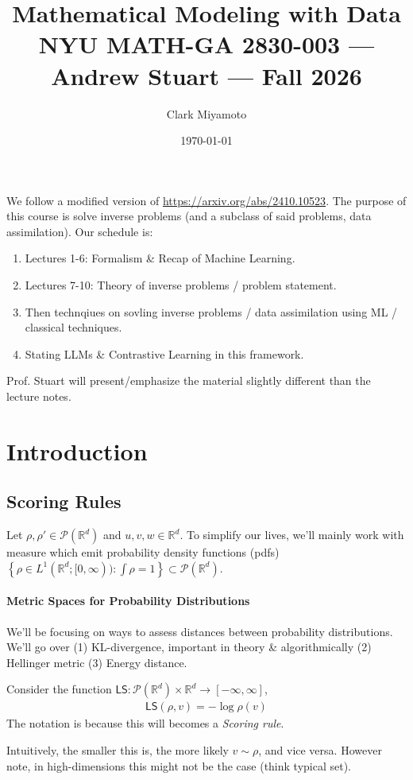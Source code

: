 \documentclass[11pt,fleqn]{article}
\title{Mathematical Modeling with Data \\[0.3em]
       \large NYU MATH-GA 2830-003 --- Andrew Stuart --- Fall 2026}
\author{Clark Miyamoto}
\date{\today}
\numberwithin{equation}{section}
\theoremstyle{definition}
\theoremstyle{definition}
\begin{document}
\maketitle

We follow a modified version of \url{https://arxiv.org/abs/2410.10523}. The purpose of this course is solve inverse problems (and a subclass of said problems, data assimilation). Our schedule is:
\begin{enumerate}
	\item Lectures 1-6: Formalism \& Recap of Machine Learning.
	\item Lectures 7-10: Theory of inverse problems / problem statement.
	\item Then technqiues on sovling inverse problems / data assimilation using ML / classical techniques.
	\item Stating LLMs \& Contrastive Learning in this framework.
\end{enumerate}
Prof. Stuart will present/emphasize the material slightly different than the lecture notes.

\tableofcontents

\newpage

\section{Introduction}

\subsection{Scoring Rules}
Let $\rho,\rho' \in \mathcal P(\mathbb R^d)$ and $u , v, w \in \mathbb R^d$. To simplify our lives, we'll mainly work with measure which emit probability density functions (pdfs) $\left\{ \rho \in L^1(\mathbb R^d; [0,\infty)) : \int \rho = 1 \right\} \subset \mathcal P(\mathbb R^d)$.

\paragraph{Metric Spaces for Probability Distributions} 
We'll be focusing on ways to assess distances between probability distributions. We'll go over (1) KL-divergence, important in theory \& algorithmically (2) Hellinger metric (3) Energy distance.

\begin{definition}
	Consider the function $\textsf{LS}: \mathcal P(\mathbb R^d) \times \mathbb R^d \to [-\infty, \infty]$,
\begin{align}
	\textsf{LS}(\rho, v) = - \log \rho(v)
\end{align}
The notation is because this will becomes a \emph{\textsf{S}coring rule}.
\end{definition}
Intuitively, the smaller this is, the more likely $v \sim \rho$, and vice versa. However note, in high-dimensions this might not be the case (think typical set).
\end{document}
